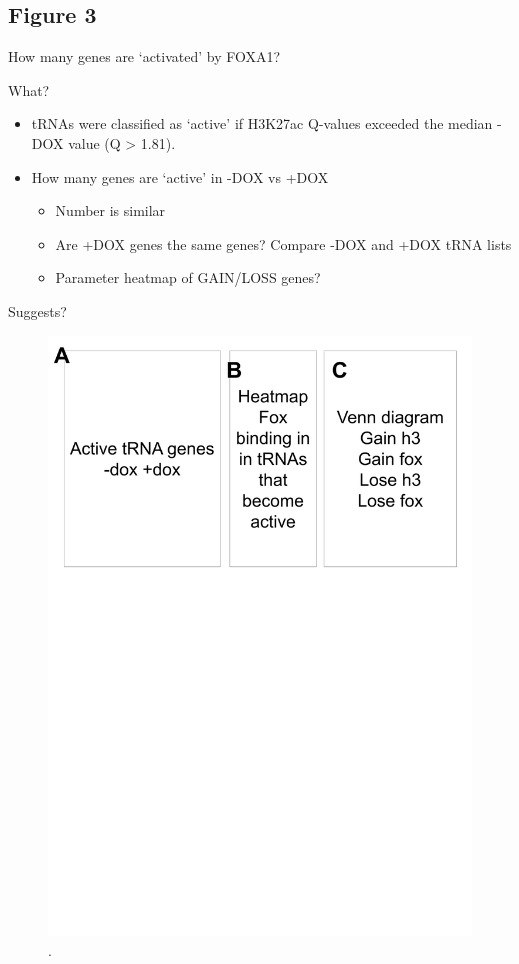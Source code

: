 \documentclass[
  12pt,
]{article}
\begin{document}
\hypertarget{figure-3}{%
\subsection{Figure 3}\label{figure-3}}

How many genes are `activated' by FOXA1?

What?

\begin{itemize}
\item
  tRNAs were classified as `active' if H3K27ac Q-values exceeded the median -DOX value (Q \textgreater{} 1.81).
\item
  How many genes are `active' in -DOX vs +DOX

  \begin{itemize}
  \item
    Number is similar
  \item
    Are +DOX genes the same genes?
    Compare -DOX and +DOX tRNA lists
  \item
    Parameter heatmap of GAIN/LOSS genes?
  \end{itemize}
\end{itemize}

Suggests?

\begin{figure}[H]

{\centering \includegraphics[width=1\linewidth]{../images/results-03} 

}

\caption{.}\label{fig:results-3}
\end{figure}
\end{document}
